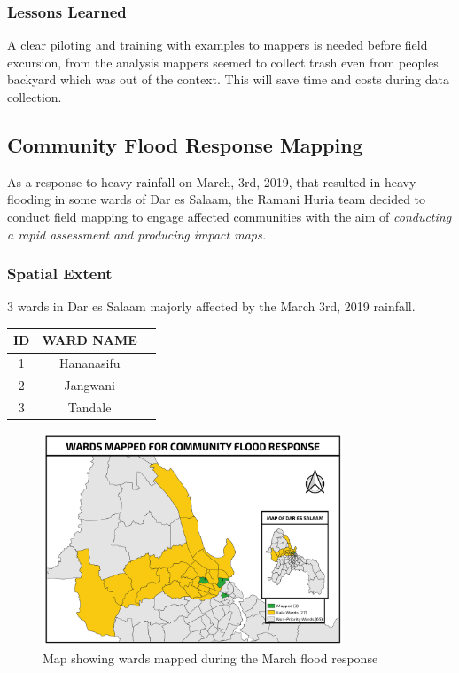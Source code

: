 \documentclass[a4paper,12pt,twoside]{article}
\begin{document}
\subsubsection{Lessons Learned}
A clear piloting and training with examples to mappers is needed before field excursion, from the analysis mappers seemed to collect trash even from peoples backyard which was out of the context. This will save time and costs during data collection.

\newpage
\subsection{Community Flood Response Mapping}
As a response to heavy rainfall on March, 3rd, 2019, that resulted in heavy flooding in some wards of Dar es Salaam, the Ramani Huria team decided to conduct field mapping to engage affected communities with the aim of \textit{conducting a rapid assessment and producing impact maps.}

\subsubsection{Spatial Extent}
3 wards in Dar es Salaam majorly affected by the March 3rd, 2019 rainfall.

\begin{center}
\begin{tabular}{|c|c|c|}
\hline
ID & WARD NAME\\
\hline
1 & Hananasifu\\
\hline
2 & Jangwani\\
\hline
3 & Tandale\\
\hline
\end{tabular}
\end{center}

\begin{figure}[h]
  \color{RHgreen}\caption{Map showing wards mapped during the March flood response}
  \centering
 \includegraphics[width=0.8\textwidth]{images/flood_response.png}
\end{figure}
\end{document}
